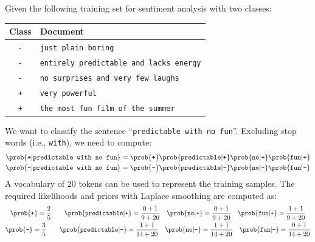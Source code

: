 \begin{example}
    Given the following training set for sentiment analysis with two classes:
    \begin{table}[H]
        \centering
        \footnotesize
        \begin{tabular}{cl}
            \toprule
            \textbf{Class} & \textbf{Document} \\
            \midrule
            \texttt{-} & \texttt{just plain boring} \\
            \texttt{-} & \texttt{entirely predictable and lacks energy} \\
            \texttt{-} & \texttt{no surprises and very few laughs} \\
            \texttt{+} & \texttt{very powerful} \\
            \texttt{+} & \texttt{the most fun film of the summer} \\
            \bottomrule
        \end{tabular}
    \end{table}
    We want to classify the sentence ``\texttt{predictable with no fun}''. Excluding stop words (i.e., \texttt{with}), we need to compute:
    \[
        \begin{split}
            \prob{\texttt{+} | \texttt{predictable with no fun}} &= \prob{\texttt{+}} \prob{\texttt{predictable} | \texttt{+}} \prob{\texttt{no} | \texttt{+}} \prob{\texttt{fun} | \texttt{+}} \\
            \prob{\texttt{-} | \texttt{predictable with no fun}} &= \prob{\texttt{-}} \prob{\texttt{predictable} | \texttt{-}} \prob{\texttt{no} | \texttt{-}} \prob{\texttt{fun} | \texttt{-}}
        \end{split}
    \]
    A vocabulary of $20$ tokens can be used to represent the training samples. The required likelihoods and priors with Laplace smoothing are computed as:
    \[
        \begin{gathered}
            \prob{\texttt{+}} = \frac{2}{5} \qquad \prob{\texttt{predictable} | \texttt{+}} = \frac{0+1}{9+20} \quad \prob{\texttt{no} | \texttt{+}} = \frac{0+1}{9+20} \quad \prob{\texttt{fun} | \texttt{+}} = \frac{1+1}{9+20} \\
            \prob{\texttt{-}} = \frac{3}{5} \qquad \prob{\texttt{predictable} | \texttt{-}} = \frac{1+1}{14+20} \quad \prob{\texttt{no} | \texttt{-}} = \frac{1+1}{14+20} \quad \prob{\texttt{fun} | \texttt{-}} = \frac{0+1}{14+20}
        \end{gathered}
    \]
\end{example}


